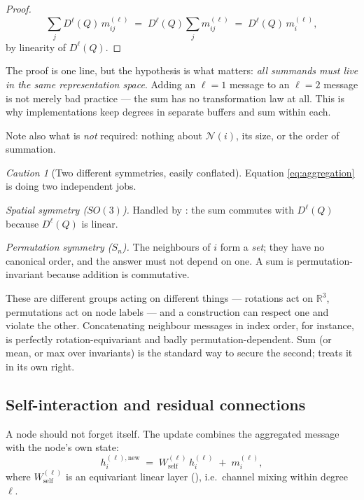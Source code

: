 \documentclass[11pt,a4paper]{report}
\theoremstyle{definition}
\theoremstyle{remark}
\newtheorem{caution}[caution]{Caution}
\newcommand{\RR}{\mathbb R}
\begin{document}
\begin{proof}
\[
\sum_{j} D^\ell(Q)\,m^{(\ell)}_{ij}
\;=\; D^\ell(Q)\sum_{j} m^{(\ell)}_{ij}
\;=\; D^\ell(Q)\,m^{(\ell)}_{i},
\]
by linearity of $D^\ell(Q)$.
\end{proof}

The proof is one line, but the hypothesis is what matters: \emph{all
summands must live in the same representation space}. Adding an $\ell=1$
message to an $\ell=2$ message is not merely bad practice --- the sum has no
transformation law at all. This is why implementations keep degrees in
separate buffers and sum within each.

Note also what is \emph{not} required: nothing about $\mathcal N(i)$, its
size, or the order of summation.

\begin{caution}[Two different symmetries, easily conflated]
\label{caution:two-symmetries}
Equation \eqref{eq:aggregation} is doing two independent jobs.

\emph{Spatial symmetry ($SO(3)$).} Handled by
: the sum commutes with $D^\ell(Q)$
because $D^\ell(Q)$ is linear.

\emph{Permutation symmetry ($S_n$).} The neighbours of $i$ form a
\emph{set}; they have no canonical order, and the answer must not depend on
one. A sum is permutation-invariant because addition is commutative.

These are different groups acting on different things --- rotations act on
$\RR^3$, permutations act on node labels --- and a construction can respect
one and violate the other. Concatenating neighbour messages in index order,
for instance, is perfectly rotation-equivariant and badly
permutation-dependent. Sum (or mean, or max over invariants) is the standard
way to secure the second;  treats it in
its own right.
\end{caution}

\subsection{Self-interaction and residual connections}
\label{sec:self-interaction}

A node should not forget itself. The update combines the aggregated message
with the node's own state:
\begin{equation}
\label{eq:node-update}
h^{(\ell),\mathrm{new}}_{i} \;=\; W^{(\ell)}_{\mathrm{self}}\,h^{(\ell)}_{i} \;+\; m^{(\ell)}_{i} ,
\end{equation}
where $W^{(\ell)}_{\mathrm{self}}$ is an equivariant linear layer
(), i.e.\ channel mixing within degree
$\ell$.
\end{document}
